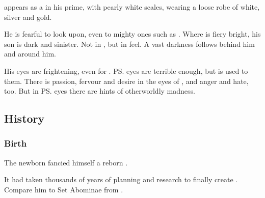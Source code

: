 \Vizsherioch appears as a \dax in his prime, with pearly white scales, wearing a loose robe of white, silver and gold. 

He is fearful to look upon, even to mighty ones such as \LocarPsyrex. 
Where \Secherdamon is fiery bright, his son \Vizsherioch is dark and sinister. 
Not in \colour, but in feel. 
A vast darkness follows behind him and around him. 

His eyes are frightening, even for \Psyrex. 
\ps{\Secherdamon} eyes are terrible enough, but \Psyrex is used to them. 
There is passion, fervour and desire in the eyes of \Secherdamon, and anger and hate, too. 
But in \ps{\Vizsherioch} eyes there are hints of otherworldly madness. 










\subsection{History}





\subsubsection{Birth}
The newborn \Vizsherioch{} fancied himself a reborn \xs. 


It had taken \Secherdamon{} thousands of years of planning and research to finally create \Vizsherioch. 
Compare him to Set Abominae from \cite{IcedEarth:SomethingWicked}. 





